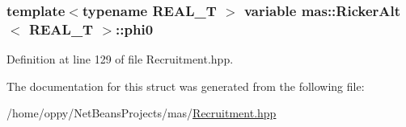 \hypertarget{structmas_1_1_ricker_alt_a64d1ad551ce910d6ccab77e80c3a217a}{
\subsubsection[{phi0}]{\setlength{\rightskip}{0pt plus 5cm}template$<$typename R\-E\-A\-L\-\_\-\-T $>$ {\bf variable} {\bf mas\-::\-Ricker\-Alt}$<$ R\-E\-A\-L\-\_\-\-T $>$\-::phi0}}\label{structmas_1_1_ricker_alt_a64d1ad551ce910d6ccab77e80c3a217a}


Definition at line 129 of file Recruitment.\-hpp.



The documentation for this struct was generated from the following file\-:\begin{DoxyCompactItemize}
\item 
/home/oppy/\-Net\-Beans\-Projects/mas/\hyperlink{_recruitment_8hpp}{Recruitment.\-hpp}\end{DoxyCompactItemize}
